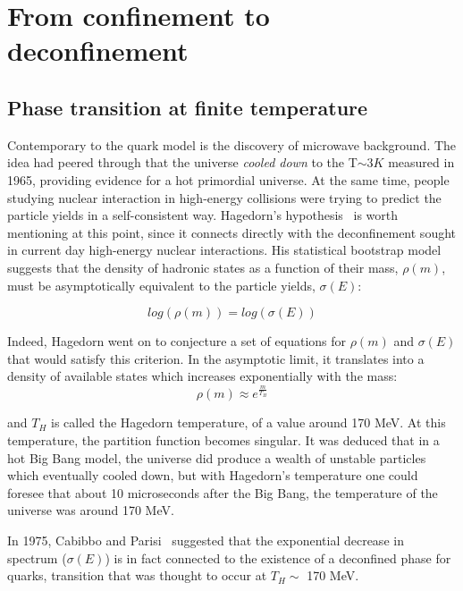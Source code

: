 \clearpage

\section{From confinement to deconfinement}

\subsection{Phase transition at finite temperature}

Contemporary to the quark model is the discovery of microwave
background. The idea had peered through that the universe \textit{cooled down} to the T$\sim 3K$ measured in 1965,
providing evidence for a hot primordial universe. At the same time,
people studying nuclear interaction in high-energy collisions were
trying to predict the particle yields in a self-consistent
way. Hagedorn's hypothesis~\cite{Hagedorn} is worth mentioning at this point, since it
connects directly with the deconfinement sought in current day
high-energy nuclear interactions. His statistical bootstrap model
suggests that the density of hadronic states as a function of their
mass, $\rho(m)$, must be
asymptotically equivalent to the particle yields, $\sigma(E)$:

\begin{equation}
log(\rho(m)) = log(\sigma(E))
\end{equation}

Indeed, Hagedorn went on to conjecture a set of equations for
$\rho(m)$ and $\sigma(E)$ that would satisfy this criterion. In the
asymptotic limit, it translates into a density of available states which
increases exponentially with the mass:
\begin{equation}
\rho(m) \approx e^{\frac{m}{T_{H}}}
\end{equation}

and $T_{H}$ is called the Hagedorn temperature, of a value around 170 MeV. At
this temperature, the partition function becomes singular. It was
deduced that in a hot Big Bang model, the universe did produce a
wealth of unstable particles which eventually cooled down, but with
Hagedorn's temperature one could foresee that about 10 microseconds
after the Big Bang, the temperature of the universe was around 170
MeV.

In 1975, Cabibbo and Parisi~\cite{cabipari} suggested that the exponential decrease in
spectrum ($\sigma(E)$) is in fact connected to the existence of a
deconfined phase for quarks, transition that was thought to
occur at $T_{H} \sim$ 170 MeV.

